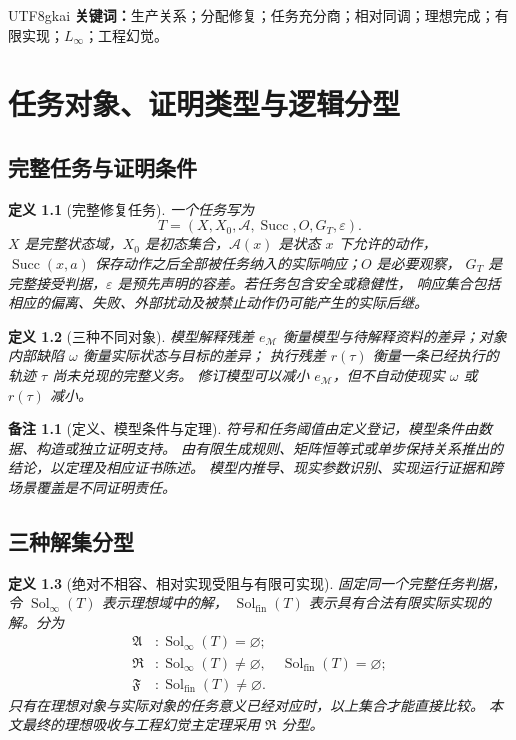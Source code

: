 \documentclass[12pt,a4paper,openany]{report}
\newtheorem{definition}{定义}[chapter]
\newtheorem{remark}{备注}[chapter]
\numberwithin{equation}{chapter}
\newcommand{\Linfty}{L_\infty}
\newcommand{\Sol}{\operatorname{Sol}}
\begin{document}
\begin{CJK*}{UTF8}{gkai}
\textbf{关键词：}生产关系；分配修复；任务充分商；相对同调；理想完成；有限实现；$\Linfty$；工程幻觉。

\tableofcontents
\clearpage
{}

\chapter{任务对象、证明类型与逻辑分型}
\label{chap:typing}

\section{完整任务与证明条件}

\begin{definition}[完整修复任务]
\label{def:task}
一个任务写为
\[
 T=(X,X_0,\mathcal A,\operatorname{Succ},O,G_T,\varepsilon).
\]
$X$ 是完整状态域，$X_0$ 是初态集合，$\mathcal A(x)$ 是状态 $x$ 下允许的动作，
$\operatorname{Succ}(x,a)$ 保存动作之后全部被任务纳入的实际响应；$O$ 是必要观察，
$G_T$ 是完整接受判据，$\varepsilon$ 是预先声明的容差。若任务包含安全或稳健性，
响应集合包括相应的偏离、失败、外部扰动及被禁止动作仍可能产生的实际后继。
\end{definition}

\begin{definition}[三种不同对象]
模型解释残差 $e_{\mathcal M}$ 衡量模型与待解释资料的差异；对象内部缺陷 $\omega$ 衡量实际状态与目标的差异；
执行残差 $r(\tau)$ 衡量一条已经执行的轨迹 $\tau$ 尚未兑现的完整义务。
修订模型可以减小 $e_{\mathcal M}$，但不自动使现实 $\omega$ 或 $r(\tau)$ 减小。
\end{definition}

\begin{remark}[定义、模型条件与定理]
符号和任务阈值由定义登记，模型条件由数据、构造或独立证明支持。
由有限生成规则、矩阵恒等式或单步保持关系推出的结论，以定理及相应证书陈述。
模型内推导、现实参数识别、实现运行证据和跨场景覆盖是不同证明责任。
\end{remark}

\section{三种解集分型}

\begin{definition}[绝对不相容、相对实现受阻与有限可实现]
固定同一个完整任务判据，令 $\Sol_\infty(T)$ 表示理想域中的解，
$\Sol_{\mathrm{fin}}(T)$ 表示具有合法有限实际实现的解。分为
\[
\begin{aligned}
 \mathfrak A &: \Sol_\infty(T)=\varnothing;\\
 \mathfrak R &: \Sol_\infty(T)\ne\varnothing,
                  \quad\Sol_{\mathrm{fin}}(T)=\varnothing;\\
 \mathfrak F &: \Sol_{\mathrm{fin}}(T)\ne\varnothing.
\end{aligned}
\]
只有在理想对象与实际对象的任务意义已经对应时，以上集合才能直接比较。
本文最终的理想吸收与工程幻觉主定理采用 $\mathfrak R$ 分型。
\end{definition}


\end{CJK*}
\end{document}
